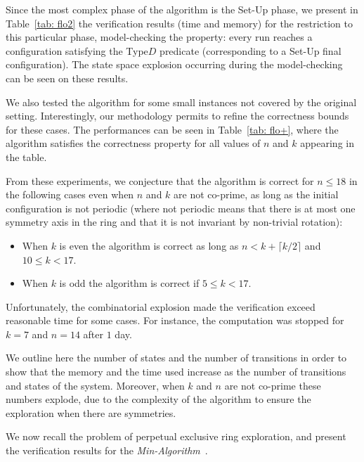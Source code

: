 Since the most complex phase of the algorithm is the Set-Up phase, we
present in Table~\ref{tab: flo2} the verification results (time and
memory) for the restriction to this particular phase, model-checking
the property: every run reaches a configuration satisfying the Type$D$
predicate (corresponding to a Set-Up final configuration).  The state
space explosion occurring during the model-checking can be seen on
these results.

We also tested the algorithm for some small instances not covered by
the original setting. Interestingly, our methodology permits to refine
the correctness bounds for these cases. The performances can be seen
in Table~\ref{tab: flo+}, where the algorithm satisfies the correctness
property for all values of $n$ and $k$ appearing in the table. 

From these experiments, we conjecture that the algorithm is correct
for $n\leq 18$ in the following cases even when $n$ and $k$ are not
co-prime, as long as the initial configuration is not periodic (where
not periodic means that there is at most one symmetry axis in the
ring and that it is not invariant by non-trivial rotation): 
\begin{itemize}%
\item When $k$ is even the algorithm is correct as long as $n <
  k+\lceil k/2 \rceil$ and $10\leq k < 17$.
\item When $k$ is odd the algorithm is correct if $5\leq k < 17$.
\end{itemize}
Unfortunately, the combinatorial explosion made the verification
exceed reasonable time for some cases. For instance, the computation
was stopped for $k=7$ and $n=14$ after $1$ day.

We outline here the number of states and the number of transitions in
order to show that the memory and the time used increase as the number
of transitions and states of the system.  Moreover, when $k$ and $n$
are not co-prime these numbers explode, due to the complexity of
the algorithm to ensure the exploration when there are symmetries.


We now recall the problem of perpetual exclusive
ring exploration, and present the verification results for the
\emph{Min-Algorithm}~\cite{blin_exclusive_2010}.




